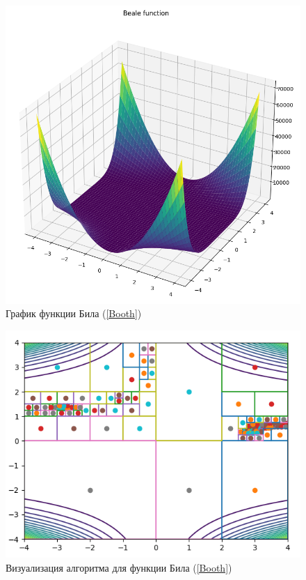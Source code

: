 \documentclass[12pt,a4paper]{article}
\begin{document}
                \begin{figure}[H]
                    \centering
                    \includegraphics[width=13cm]{beale.png}
                    \caption{График функции Била (\ref{Booth})}
                    \label{fig:Boot1}
                \end{figure}
                
                
                \begin{figure}[H]
                    \centering
                    \includegraphics[width=13cm]{beale_visual.png}
                    \caption{Визуализация алгоритма для функции Била (\ref{Booth})}
                    \label{fig:Boot2}
                \end{figure}
\end{document}
